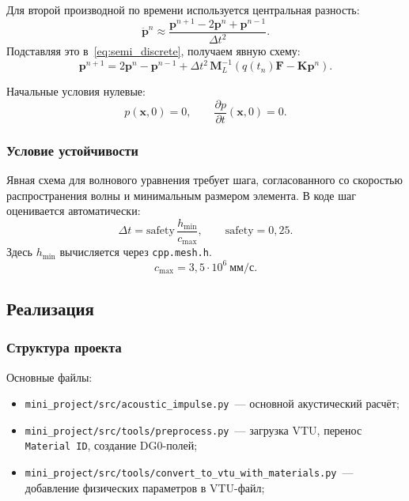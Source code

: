 Для второй производной по времени используется центральная разность:
\begin{equation}
  \ddot{\mathbf{p}}^n \approx
  \frac{\mathbf{p}^{n+1}-2\mathbf{p}^{n}+\mathbf{p}^{n-1}}{\Delta t^2}.
\end{equation}
Подставляя это в~\eqref{eq:semi_discrete}, получаем явную схему:
\begin{equation}\label{eq:explicit_acoustic}
  \mathbf{p}^{n+1}
  =
  2\mathbf{p}^{n}-\mathbf{p}^{n-1}
  +
  \Delta t^2\,\mathbf{M}_L^{-1}
  \left(
    q(t_n)\mathbf{F}-\mathbf{K}\mathbf{p}^{n}
  \right).
\end{equation}

Начальные условия нулевые:
\[
  p(\mathbf{x},0)=0, \qquad
  \frac{\partial p}{\partial t}(\mathbf{x},0)=0.
\]

\subsubsection{Условие устойчивости}

Явная схема для волнового уравнения требует шага, согласованного
со скоростью распространения волны и минимальным размером элемента.
В коде шаг оценивается автоматически:
\begin{equation}
  \Delta t =
  \mathrm{safety}\,
  \frac{h_{\min}}{c_{\max}},
  \qquad
  \mathrm{safety}=0{,}25.
\end{equation}
Здесь $h_{\min}$ вычисляется через \texttt{cpp.mesh.h}.
\[
  c_{\max}=3{,}5\cdot 10^6~\text{мм/с}.
\]

\subsection{Реализация}

\subsubsection{Структура проекта}

Основные файлы:
\begin{itemize}
  \item \texttt{mini\_project/src/acoustic\_impulse.py}~--- основной
        акустический расчёт;
  \item \texttt{mini\_project/src/tools/preprocess.py}~--- загрузка VTU,
        перенос \texttt{Material ID}, создание DG0-полей;
  \item \texttt{mini\_project/src/tools/convert\_to\_vtu\_with\_materials.py}~---
        добавление физических параметров в VTU-файл;
\end{itemize}

